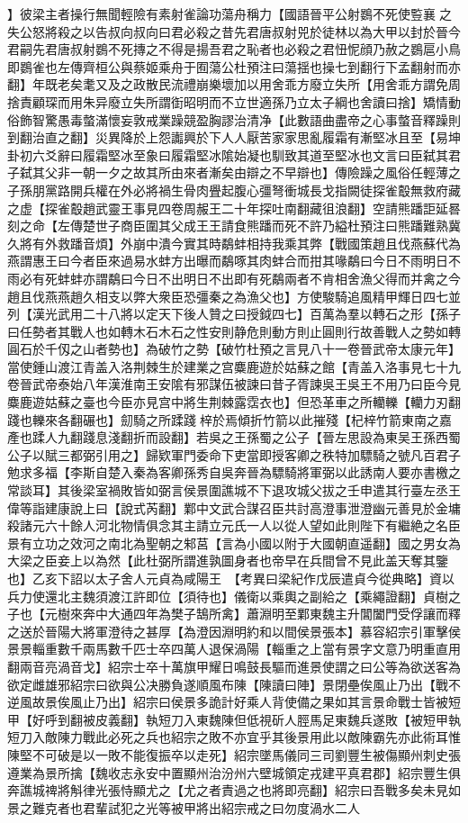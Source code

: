 】彼梁主者操行無聞輕險有素射雀論功蕩舟稱力【國語晉平公射鷃不死使䜿襄之失公怒將殺之以告叔向叔向曰君必殺之昔先君唐叔射兕於徒林以為大甲以封於晉今君嗣先君唐叔射鷃不死摶之不得是揚吾君之恥者也必殺之君忸怩顔乃赦之鷃扈小鳥即鷃雀也左傳齊桓公與蔡姬乘舟于囿蕩公杜預注曰蕩揺也操七到翻行下孟翻射而亦翻】年既老矣耄又及之政散民流禮崩樂壞加以用舍乖方廢立失所【用舍乖方謂免周捨責顧琛而用朱异廢立失所謂衘昭明而不立世適孫乃立太子綱也舍讀曰捨】矯情動俗飾智驚愚毒螫滿懷妄敦戒業躁競盈胸謬治清净【此數語曲盡帝之心事螫音釋躁則到翻治直之翻】災異降於上怨讟興於下人人厭苦家家思亂履霜有漸堅冰且至【易坤卦初六爻辭曰履霜堅冰至象曰履霜堅冰隂始凝也馴致其道至堅冰也文言曰臣弑其君子弑其父非一朝一夕之故其所由來者漸矣由辯之不早辯也】傳險躁之風俗任輕薄之子孫朋黨路開兵權在外必將禍生骨肉舋起腹心彊弩衝城長戈指闕徒探雀鷇無救府藏之虚【探雀鷇趙武靈王事見四卷周赧王二十年探吐南翻藏徂浪翻】空請熊蹯詎延晷刻之命【左傳楚世子商臣圍其父成王王請食熊蹯而死不許乃縊杜預注曰熊蹯難熟冀久將有外救蹯音煩】外崩中潰今實其時鷸蚌相持我乘其弊【戰國策趙且伐燕蘇代為燕謂惠王曰今者臣來過易水蚌方出曝而鷸啄其肉蚌合而拑其喙鷸曰今日不雨明日不雨必有死蚌蚌亦謂鷸曰今日不出明日不出即有死鷸兩者不肯相舍漁父得而并禽之今趙且伐燕燕趙久相支以弊大衆臣恐彊秦之為漁父也】方使駿騎追風精甲輝日四七並列【漢光武用二十八將以定天下後人贊之曰授鉞四七】百萬為羣以轉石之形【孫子曰任勢者其戰人也如轉木石木石之性安則静危則動方則止圓則行故善戰人之勢如轉圓石於千仭之山者勢也】為破竹之勢【破竹杜預之言見八十一卷晉武帝太康元年】當使鍾山渡江青盖入洛荆棘生於建業之宫麋鹿遊於姑蘇之館【青盖入洛事見七十九卷晉武帝泰始八年漢淮南王安隂有邪謀伍被諫曰昔子胥諫吳王吳王不用乃曰臣今見麋鹿遊姑蘇之臺也今臣亦見宫中將生荆棘露霑衣也】但恐革車之所轥轢【轥力刃翻踐也轢來各翻碾也】劎騎之所蹂踐梓於焉傾折竹箭以此摧殘【杞梓竹箭東南之嘉產也蹂人九翻踐息淺翻折而設翻】若吳之王孫蜀之公子【晉左思設為東吴王孫西蜀公子以賦三都弼引用之】歸欵軍門委命下吏當即授客卿之秩特加驃騎之號凡百君子勉求多福【李斯自楚入秦為客卿孫秀自吳奔晉為驃騎將軍弼以此誘南人要亦書檄之常談耳】其後梁室禍敗皆如弼言侯景圍譙城不下退攻城父拔之壬申遣其行臺左丞王偉等詣建康說上曰【說式芮翻】鄴中文武合謀召臣共討高澄事泄澄幽元善見於金墉殺諸元六十餘人河北物情俱念其主請立元氏一人以從人望如此則陛下有繼絶之名臣景有立功之效河之南北為聖朝之邾莒【言為小國以附于大國朝直遥翻】國之男女為大梁之臣妾上以為然【此杜弼所謂進孰圖身者也帝早在兵間曾不見此盖天奪其鑒也】乙亥下詔以太子舍人元貞為咸陽王　【考異曰梁紀作戊辰遣貞今從典略】資以兵力使還北主魏須渡江許即位【須待也】儀衛以乘輿之副給之【乘繩證翻】貞樹之子也【元樹來奔中大通四年為樊子鵠所禽】蕭淵明至鄴東魏主升閶闔門受俘讓而釋之送於晉陽大將軍澄待之甚厚【為澄因淵明約和以間侯景張本】慕容紹宗引軍擊侯景景輜重數千兩馬數千匹士卒四萬人退保渦陽【輜重之上當有景字文意乃明重直用翻兩音亮渦音戈】紹宗士卒十萬旗甲耀日鳴鼓長驅而進景使謂之曰公等為欲送客為欲定雌雄邪紹宗曰欲與公决勝負遂順風布陳【陳讀曰陣】景閉壘俟風止乃出【戰不逆風故景俟風止乃出】紹宗曰侯景多詭計好乘人背使備之果如其言景命戰士皆被短甲【好呼到翻被皮義翻】執短刀入東魏陳但低視斫人脛馬足東魏兵遂敗【被短甲執短刀入敵陳力戰此必死之兵也紹宗之敗不亦宜乎其後景用此以敵陳霸先亦此術耳惟陳堅不可破是以一敗不能復振卒以走死】紹宗墜馬儀同三司劉豐生被傷顯州刺史張遵業為景所擒【魏收志永安中置顯州治汾州六壁城領定戎建平真君郡】紹宗豐生俱奔譙城禆將斛律光張恃顯尤之【尤之者責過之也將即亮翻】紹宗曰吾戰多矣未見如景之難克者也君輩試犯之光等被甲將出紹宗戒之曰勿度渦水二人